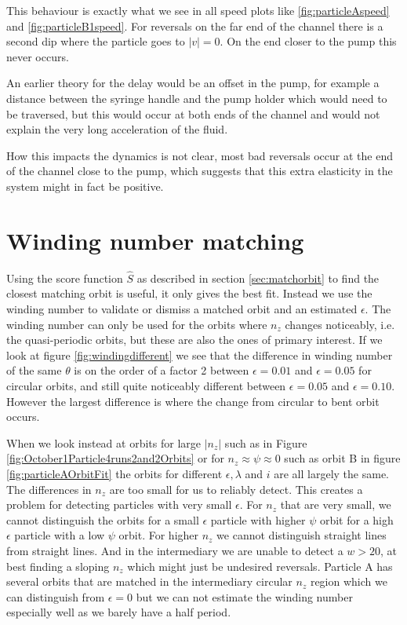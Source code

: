 This behaviour is exactly what we see in all speed plots like \ref{fig:particleAspeed} and \ref{fig:particleB1speed}. 
For reversals on the far end of the channel there is a second dip where the particle goes to $\left|v\right|=0$. 
On the end closer to the pump this never occurs. 

An earlier theory for the delay would be an offset in the pump, for example a distance between the syringe handle and the pump holder which would need to be traversed, but this would occur at both ends of the channel and would not explain the very long acceleration of the fluid.

How this impacts the dynamics is not clear, most bad reversals occur at the end of the channel close to the pump, which suggests 
that this extra elasticity in the system might in fact be positive. 

\section{Winding number matching}
Using the score function $\hat{S}$ as described in section \ref{sec:matchorbit} to find the closest matching orbit is useful, it only gives the best fit.  Instead we use the winding number to validate or dismiss a matched orbit and an estimated $\epsilon$. The winding number can only be used for the orbits where $n_z$ changes noticeably, i.e. the quasi-periodic orbits, but these are also the ones of primary interest. 
If we look at figure \ref{fig:windingdifferent} we see that the difference in winding number of the 
same $\theta$ is on the order of a factor 2 between $\epsilon = 0.01$ and $\epsilon = 0.05$ for circular orbits, and 
still quite noticeably different between $\epsilon = 0.05$ and $\epsilon = 0.10$. However the largest difference is where the change from 
circular to bent orbit occurs. 

When we look instead at orbits for large $\left| n_z \right|$ such as in Figure 
\ref{fig:October1Particle4runs2and2Orbits} or for $n_z \approx \psi \approx 0$ such as orbit B in figure 
\ref{fig:particleAOrbitFit} the orbits for different $\epsilon, \lambda$ 
and $i$ are all largely the same. The differences in $n_z$ are too small for us to reliably detect. This creates a problem for 
detecting particles with very small $\epsilon$. For $n_z$ that are very small, we cannot distinguish the orbits for a 
small $\epsilon$ particle with higher $\psi$ orbit for a high $\epsilon$ particle with a low $\psi$ orbit. For higher 
$n_z$ we cannot distinguish straight lines from straight lines. And in the intermediary we are unable to detect a $w 
> 20$, at best finding a sloping $n_z$ which might just be undesired reversals. Particle A has several orbits that 
are matched in the intermediary circular $n_z$ region which we can distinguish from $\epsilon = 0$ but we can not 
estimate the winding number especially well as we barely have a half period. 


